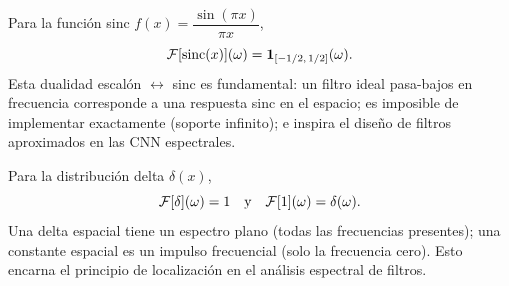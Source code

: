 \begin{example}
\label{ex:grids:fourier-sinc}
Para la funci\'on sinc $f(x) = \dfrac{\sin(\pi x)}{\pi x}$,
\[
  \mathcal{F}[\operatorname{sinc}(x)](\omega) = \mathbf{1}_{[-1/2,\,1/2]}(\omega).
\]
Esta dualidad escal\'on $\leftrightarrow$ sinc es fundamental: un filtro ideal
pasa-bajos en frecuencia corresponde a una respuesta sinc en el espacio; es
imposible de implementar exactamente (soporte infinito); e inspira el dise\~no
de filtros aproximados en las CNN espectrales.
\end{example}

\begin{example}
\label{ex:grids:fourier-delta}
Para la distribuci\'on delta $\delta(x)$,
\[
  \mathcal{F}[\delta](\omega) = 1 \quad \text{y} \quad \mathcal{F}[1](\omega) = \delta(\omega).
\]
Una delta espacial tiene un espectro plano (todas las frecuencias presentes);
una constante espacial es un impulso frecuencial (solo la frecuencia cero). Esto
encarna el principio de localizaci\'on en el an\'alisis espectral de filtros.
\end{example}


